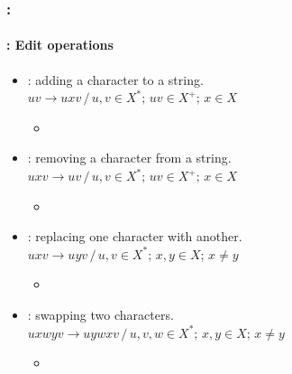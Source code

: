 \documentclass[xcolor=table]{beamer}
\begin{document}
\begin{frame}
	\frametitle{\insertshortsubtitle: \insertsection}
	\framesubtitle{\insertsubsection: Edit operations}

	\begin{itemize}
		\item {}: adding a character to a string.\\
		$uv \rightarrow uxv \,/\, u, v \in X^*;\, uv \in X^+;\, x \in X$
		\begin{itemize}
			\item {}
		\end{itemize}
		
		\item {}: removing a character from a string.\\
		$uxv \rightarrow uv \,/\, u, v \in X^*;\, uv \in X^+;\, x \in X$
		\begin{itemize}
			\item {}
		\end{itemize}
		
		\item {}: replacing one character with another.\\
		$uxv \rightarrow uyv \,/\, u, v \in X^*;\, x, y \in X;\, x \ne y$
		\begin{itemize}
			\item {}
		\end{itemize}
		
		\item {}: swapping two characters.\\
		$uxwyv \rightarrow uywxv \,/\, u, v, w \in X^*;\, x, y \in X;\, x \ne y$
		\begin{itemize}
			\item {}
		\end{itemize}
	\end{itemize}

\end{frame}
\end{document}
